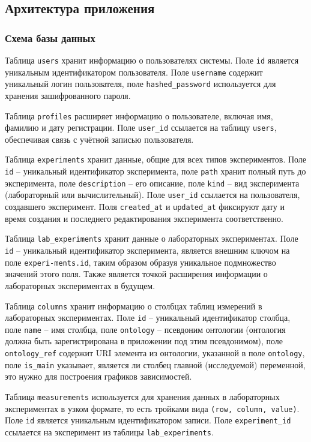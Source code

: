 \subsection{Архитектура приложения}

\subsubsection{Схема базы данных}

Таблица \texttt{users} хранит информацию о пользователях системы.
Поле \texttt{id} является уникальным идентификатором пользователя. Поле \texttt{username} содержит уникальный логин пользователя, поле \texttt{hashed\_password} используется для хранения зашифрованного пароля.

Таблица \texttt{profiles} расширяет информацию о пользователе, включая имя, фамилию и дату регистрации.
Поле \texttt{user\_id} ссылается на таблицу \texttt{users}, обеспечивая связь с учётной записью пользователя.

Таблица \texttt{experiments} хранит данные, общие для всех типов экспериментов.
Поле \texttt{id} -- уникальный идентификатор эксперимента, поле \texttt{path} хранит полный путь до эксперимента, поле \texttt{description} -- его описание, поле \texttt{kind} -- вид эксперимента (лабораторный или вычислительный). Поле \texttt{user\_id} ссылается на пользователя, создавшего эксперимент. Поля \texttt{created\_at} и \texttt{updated\_at} фиксируют дату и время создания и последнего редактирования эксперимента соответственно.

Таблица \texttt{lab\_experiments} хранит данные о лабораторных экспериментах.
Поле \texttt{id} -- уникальный идентификатор эксперимента, является внешним ключом на поле \texttt{experi-\allowbreak ments.id}, таким образом образуя уникальное подмножество значений этого поля.
Также является точкой расширения информации о лабораторных экспериментах в будущем.

Таблица \texttt{columns} хранит информацию о столбцах таблиц измерений в лабораторных экспериментах.
Поле \texttt{id} -- уникальный идентификатор столбца, поле \texttt{name} -- имя столбца, поле \texttt{ontology} -- псевдоним онтологии (онтология должна быть зарегистрирована в приложении под этим псевдонимом), поле \texttt{ontology\_ref} содержит URI элемента из онтологии, указанной в поле \texttt{ontology}, поле \texttt{is\_main} указывает, является ли столбец главной (исследуемой) переменной, это нужно для построения графиков зависимостей.

Таблица \texttt{measurements} используется для хранения данных в лабораторных экспериментах в узком формате, то есть тройками вида \texttt{(row, column, value)}.
Поле \texttt{id} является уникальным идентификатором записи.
Поле \texttt{experiment\_id} ссылается на эксперимент из таблицы \texttt{lab\_experiments}.

